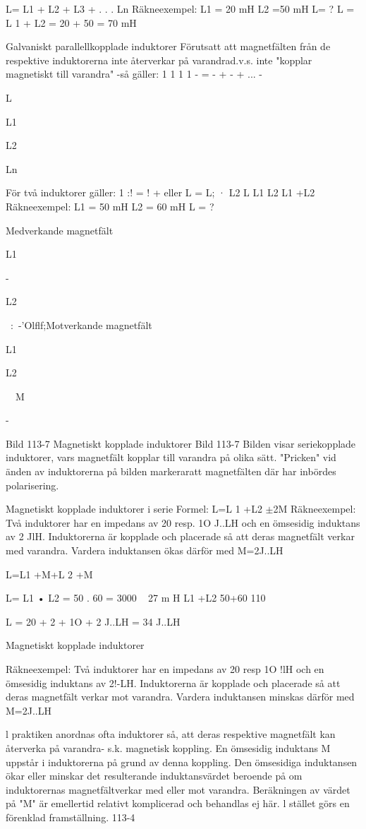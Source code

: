 \documentclass[a4paper,twoside,twocolumn,openright]{book}
\begin{document}
{{{{L= L1 + L2 + L3 + . . . Ln
Räkneexempel:
L1 = 20 mH L2 =50 mH L= ?
L = L 1 + L2 = 20 + 50 = 70 mH

Galvaniskt parallellkopplade induktorer
Förutsatt att magnetfälten från de respektive
induktorerna inte återverkar på varandrad.v.s. inte "kopplar magnetiskt till varandra"
-så gäller:
1
1
1
1
- = - + - + ... -

L

L1

L2

Ln

För två induktorer gäller:
1
:! = ! + eller
L = L; · L2
L L1 L2
L1 +L2
Räkneexempel:
L1 = 50 mH L2 = 60 mH L = ?

Medverkande magnetfält

L1

-

L2

~:~-'Olflf;Motverkande magnetfält

L1

L2

~~M~

-

Bild 113-7 Magnetiskt kopplade induktorer
Bild 113-7
Bilden visar seriekopplade induktorer, vars
magnetfält kopplar till varandra på olika sätt.
"Pricken" vid änden av induktorerna på
bilden markeraratt magnetfälten där har inbördes polarisering.

Magnetiskt kopplade induktorer i serie
Formel:
L=L 1 +L2 $\pm$2M
Räkneexempel:
Två induktorer har en impedans av 20 resp.
1O J..LH och en ömsesidig induktans av 2 JlH.
Induktorerna är kopplade och placerade så
att deras magnetfält verkar med varandra.
Vardera induktansen ökas därför med
M=2J..LH

L=L1 +M+L 2 +M

L= L1 • L2 = 50 . 60 = 3000 ~ 27 m H
L1 +L2
50+60
110

L = 20 + 2 + 1O + 2 J..LH = 34 J..LH

Magnetiskt kopplade induktorer

Räkneexempel:
Två induktorer har en impedans av 20 resp
1O !lH och en ömsesidig induktans av 2!-LH.
Induktorerna är kopplade och placerade så
att deras magnetfält verkar mot varandra.
Vardera induktansen minskas därför med
M=2J..LH

l praktiken anordnas ofta induktorer så, att
deras respektive magnetfält kan återverka
på varandra- s.k. magnetisk koppling.
En ömsesidig induktans M uppstår i
induktorerna på grund av denna koppling.
Den ömsesidiga induktansen ökar eller minskar det resulterande induktansvärdet beroende på om induktorernas magnetfältverkar
med eller mot varandra.
Beräkningen av värdet på "M" är emellertid relativt komplicerad och behandlas ej här.
l stället görs en förenklad framställning.
113-4

}}}}
\end{document}
